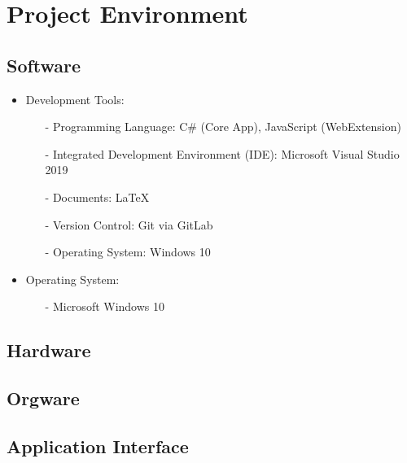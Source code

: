 \chapter{Project Environment}
\label{ch:environment}

\section{Software}
\begin{itemize}
\item Development Tools:
	\begin{itemize}
	\item[-] Programming Language: C\# (Core App), JavaScript (WebExtension)
	\item[-] Integrated Development Environment (IDE): Microsoft Visual Studio 2019
	\item[-] Documents: LaTeX
	\item[-] Version Control: Git via GitLab
	\item[-] Operating System: Windows 10
	\end{itemize}

\item Operating System:
	\begin{itemize}
	\item[-] Microsoft Windows 10
	\end{itemize}
\end{itemize}

\section{Hardware}
\section{Orgware}
\section{Application Interface}